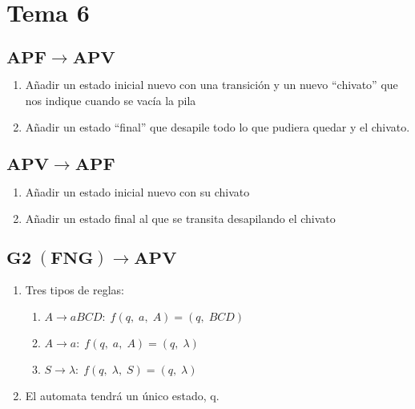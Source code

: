 \documentclass[12pt, twoside, openright]{report} %
\begin{document}
\section{Tema 6}
\subsection{$\boldsymbol{APF \rightarrow APV}$}
\begin{enumerate}
	\item Añadir un estado inicial nuevo con una transición y un nuevo \enquote{chivato} que nos indique cuando se vacía la pila
	\item Añadir un estado \enquote{final} que desapile todo lo que pudiera quedar y el chivato.
\end{enumerate}
\subsection{$\boldsymbol{APV \rightarrow APF}$}
\begin{enumerate}
	\item Añadir un estado inicial nuevo con su chivato
	\item Añadir un estado final al que se transita desapilando el chivato
\end{enumerate}

\subsection{$\boldsymbol{G2 \; (FNG) \rightarrow APV}$}
\begin{enumerate}
	\item Tres tipos de reglas:
	      \begin{enumerate}
		      \item $A \rightarrow aBCD: \; f(q,\; a,\; A) = (q,\; BCD)$
		      \item $A \rightarrow a: \; f(q,\; a,\; A) = (q,\; \lambda)$
		      \item $S \rightarrow \lambda: \; f(q,\; \lambda,\; S) = (q,\; \lambda)$
	      \end{enumerate}
	\item El automata tendrá un único estado, q.
\end{enumerate}
\end{document}
